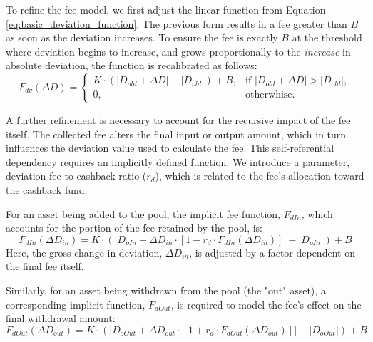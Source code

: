 To refine the fee model, we first adjust the linear function from Equation \ref{eq:basic_deviation_function}. The previous form results in a fee greater than $B$ as soon as the deviation increases. To ensure the fee is exactly $B$ at the threshold where deviation begins to increase, and grows proportionally to the \textit{increase} in absolute deviation, the function is recalibrated as follows:
\begin{equation}
	\label{eq:general_deviation_function}
	F_{dv}(\Delta D) = \begin{cases} 
		K \cdot (\lvert D_{old} + \Delta D \rvert - \lvert D_{old} \rvert) + B, & \text{if } \lvert D_{old} + \Delta D \rvert > \lvert D_{old} \rvert, \\
		0, & \text{otherwhise.} 
	\end{cases}	
\end{equation}

A further refinement is necessary to account for the recursive impact of the fee itself. The collected fee alters the final input or output amount, which in turn influences the deviation value used to calculate the fee. This self-referential dependency requires an implicitly defined function. We introduce a parameter, deviation fee to cashback ratio ($r_d$), which is related to the fee's allocation toward the cashback fund.

For an asset being added to the pool, the implicit fee function, $F_{dIn}$, which accounts for the portion of the fee retained by the pool, is:
\begin{equation}
	\label{eq:deviation_in_function}
	F_{dIn}(\Delta D_{in}) = K \cdot (\lvert D_{oIn} + \Delta D_{in} \cdot [1 - r_{d} \cdot F_{dIn}(\Delta D_{in}) ] \rvert - \lvert D_{oIn} \rvert) + B  
\end{equation}
Here, the gross change in deviation, $\Delta D_{in}$, is adjusted by a factor dependent on the final fee itself.

Similarly, for an asset being withdrawn from the pool (the "out" asset), a corresponding implicit function, $F_{dOut}$, is required to model the fee's effect on the final withdrawal amount:
\begin{equation}
	\label{eq:deviation_out_function}
	F_{dOut}(\Delta D_{out}) = K \cdot (\lvert D_{oOut} + \Delta D_{out} \cdot [1 + r_{d} \cdot F_{dOut}(\Delta D_{out})] \rvert - \lvert D_{oOut} \rvert) + B 
\end{equation}

